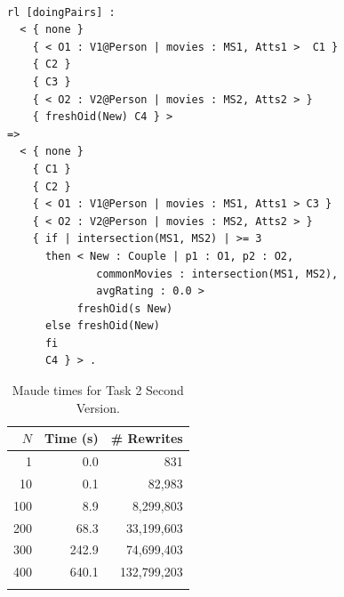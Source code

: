 \begin{lstlisting}[caption=\code{doingCouples} Maude rule., label=lst:task2SecondVersion]

rl [doingPairs] :
  < { none }
    { < O1 : V1@Person | movies : MS1, Atts1 >  C1 }
    { C2 }
    { C3 }
    { < O2 : V2@Person | movies : MS2, Atts2 > }
    { freshOid(New) C4 } >
=> 
  < { none }
    { C1 }
    { C2 }
    { < O1 : V1@Person | movies : MS1, Atts1 > C3 }
    { < O2 : V2@Person | movies : MS2, Atts2 > }
    { if | intersection(MS1, MS2) | >= 3 
      then < New : Couple | p1 : O1, p2 : O2, 
              commonMovies : intersection(MS1, MS2), 
              avgRating : 0.0 >
           freshOid(s New)
      else freshOid(New)
      fi 
      C4 } > .
\end{lstlisting}

\begin{table}[htb]
\renewcommand{\tabcolsep}{6pt}
\renewcommand{\arraystretch}{1.2}
    \centering
	\begin{tabular}{r r r}
	$N$ & Time (s) & \# Rewrites \\
	\hline
	1 & 0.0 & 831 \\
	10 & 0.1 & 82,983 \\
	100 & 8.9 & 8,299,803 \\
	200 & 68.3 & 33,199,603 \\
	300 & 242.9 & 74,699,403 \\
	400 & 640.1 & 132,799,203 \\
	\hline \\
	\end{tabular}
	\caption{Maude times for Task 2 Second Version.}\label{table:maudetask22}
\end{table}
